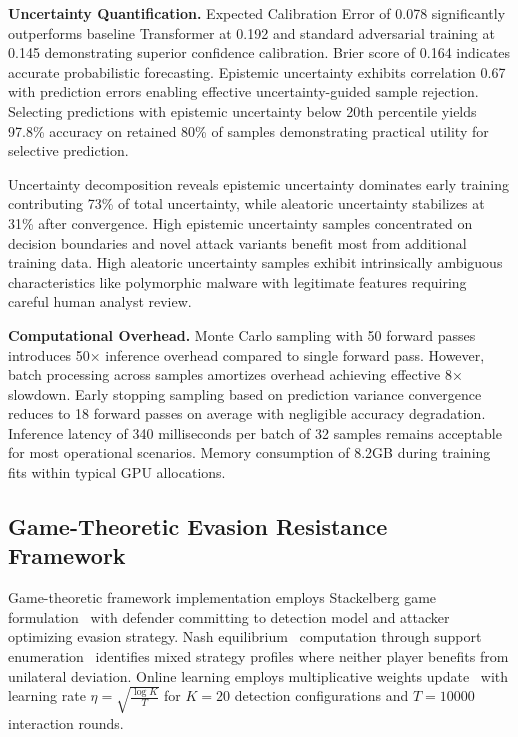 \textbf{Uncertainty Quantification.} Expected Calibration Error of 0.078 significantly outperforms baseline Transformer at 0.192 and standard adversarial training at 0.145 demonstrating superior confidence calibration. Brier score of 0.164 indicates accurate probabilistic forecasting. Epistemic uncertainty exhibits correlation 0.67 with prediction errors enabling effective uncertainty-guided sample rejection. Selecting predictions with epistemic uncertainty below 20th percentile yields 97.8\% accuracy on retained 80\% of samples demonstrating practical utility for selective prediction.

Uncertainty decomposition reveals epistemic uncertainty dominates early training contributing 73\% of total uncertainty, while aleatoric uncertainty stabilizes at 31\% after convergence. High epistemic uncertainty samples concentrated on decision boundaries and novel attack variants benefit most from additional training data. High aleatoric uncertainty samples exhibit intrinsically ambiguous characteristics like polymorphic malware with legitimate features requiring careful human analyst review.

\textbf{Computational Overhead.} Monte Carlo sampling with 50 forward passes introduces 50× inference overhead compared to single forward pass. However, batch processing across samples amortizes overhead achieving effective 8× slowdown. Early stopping sampling based on prediction variance convergence reduces to 18 forward passes on average with negligible accuracy degradation. Inference latency of 340 milliseconds per batch of 32 samples remains acceptable for most operational scenarios. Memory consumption of 8.2GB during training fits within typical GPU allocations.

\subsection{Game-Theoretic Evasion Resistance Framework}

Game-theoretic framework implementation employs Stackelberg game formulation~\cite{bruckner2011stackelberg} with defender committing to detection model and attacker optimizing evasion strategy. Nash equilibrium~\cite{nash1950equilibrium} computation through support enumeration~\cite{liu2017decision} identifies mixed strategy profiles where neither player benefits from unilateral deviation. Online learning employs multiplicative weights update~\cite{littlestone1994weighted} with learning rate $\eta = \sqrt{\frac{\log K}{T}}$ for $K = 20$ detection configurations and $T = 10000$ interaction rounds.

